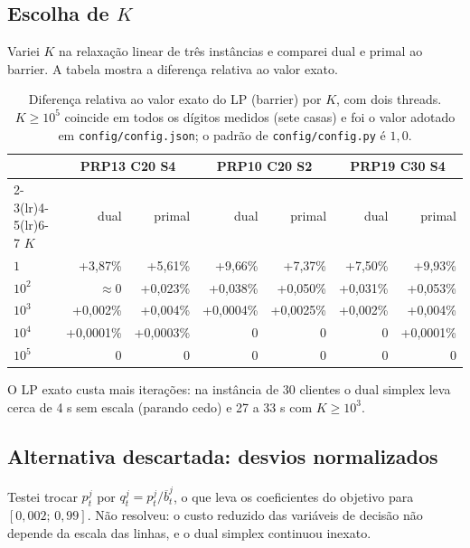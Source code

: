 \documentclass[11pt,a4paper]{article}
\newcommand{\tb}[1]{\overline{b}_{#1}}
\begin{document}
\subsection{Escolha de $K$}

Variei $K$ na relaxação linear de três instâncias e comparei dual e primal ao
barrier. A tabela mostra a diferença relativa ao valor exato.

\begin{table}[h]
  \centering
  \begin{tabular}{lrrrrrr}
    \toprule
    & \multicolumn{2}{c}{PRP13 C20 S4} & \multicolumn{2}{c}{PRP10 C20 S2} & \multicolumn{2}{c}{PRP19 C30 S4}\\
    \cmidrule(lr){2-3}\cmidrule(lr){4-5}\cmidrule(lr){6-7}
    $K$ & dual & primal & dual & primal & dual & primal\\
    \midrule
    $1$      & +3{,}87\%   & +5{,}61\%   & +9{,}66\%   & +7{,}37\%   & +7{,}50\%   & +9{,}93\%\\
    $10^{2}$ & $\approx 0$ & +0{,}023\%  & +0{,}038\%  & +0{,}050\%  & +0{,}031\%  & +0{,}053\%\\
    $10^{3}$ & +0{,}002\%  & +0{,}004\%  & +0{,}0004\% & +0{,}0025\% & +0{,}002\%  & +0{,}004\%\\
    $10^{4}$ & +0{,}0001\% & +0{,}0003\% & $0$         & $0$         & $0$         & +0{,}0001\%\\
    $10^{5}$ & $0$         & $0$         & $0$         & $0$         & $0$         & $0$\\
    \bottomrule
  \end{tabular}
  \caption{Diferença relativa ao valor exato do LP (barrier) por $K$, com dois
  threads. $K\ge10^{5}$ coincide em todos os dígitos medidos (sete casas) e foi
  o valor adotado em \texttt{config/config.json}; o padrão de
  \texttt{config/config.py} é $1{,}0$.}
\end{table}

O LP exato custa mais iterações: na instância de 30 clientes o dual simplex
leva cerca de 4 s sem escala (parando cedo) e 27 a 33 s com $K\ge10^{3}$.

\subsection{Alternativa descartada: desvios normalizados}

Testei trocar $p_t^j$ por $q_t^j=p_t^j/\tb{t}^j$, o que leva os coeficientes do
objetivo para $[0{,}002;\,0{,}99]$. Não resolveu: o custo reduzido das variáveis
de decisão não depende da escala das linhas, e o dual simplex continuou
inexato.
\end{document}
